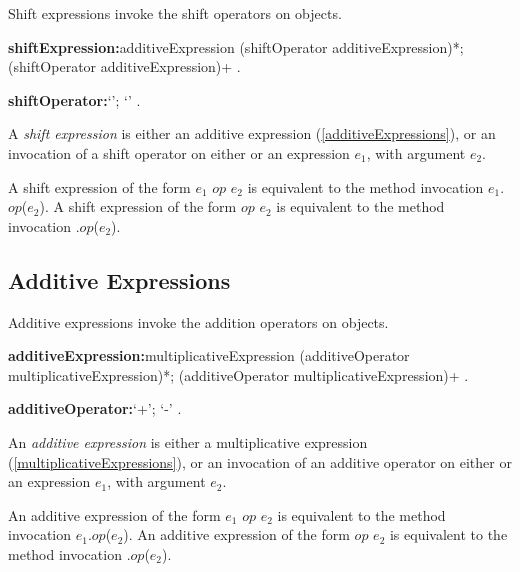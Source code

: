 \documentclass{article}
\newcommand{\code}[1]{{\sf #1}}
\begin{document}
\LMHash{}
Shift expressions invoke the shift operators on objects.

 \begin{grammar}
{\bf shiftExpression:}additiveExpression (shiftOperator additiveExpression)*;
      \SUPER{} (shiftOperator additiveExpression)+
    .

{\bf shiftOperator:}`{\escapegrammar \lt\lt'};
       `{\escapegrammar \gt \gt}' 
    .
 \end{grammar}
 
\LMHash{}
A {\em shift expression} is either an additive expression (\ref{additiveExpressions}), or an invocation of a shift operator on either \SUPER{} or an expression $e_1$, with argument $e_2$.
 
\LMHash{}
 A shift expression of the form  $e_1$ $op$ $e_2$ is equivalent to the method invocation \code{$e_1$.$op$($e_2$)}. A shift expression of the form  \SUPER{} $op$ $e_2$ is equivalent to the method invocation \code{\SUPER{}.$op$($e_2$)}. 

     
 \subsection{ Additive Expressions}

\LMHash{}
Additive expressions invoke the addition operators on objects.

 \begin{grammar}
{\bf additiveExpression:}multiplicativeExpression (additiveOperator multiplicativeExpression)*;
      \SUPER{} (additiveOperator multiplicativeExpression)+
    .

{\bf additiveOperator:}`+';
      `-'
    .
 \end{grammar}
 
\LMHash{}
An {\em additive expression} is either a multiplicative expression (\ref{multiplicativeExpressions}), or an invocation of an additive operator on either \SUPER{} or an expression $e_1$, with argument $e_2$.

\LMHash{}
An additive expression of the form  $e_1$ $op$ $e_2$ is equivalent to the method invocation \code{$e_1$.$op$($e_2$)}. An additive expression of the form  \SUPER{} $op$ $e_2$ is equivalent to the method invocation \code{\SUPER{}.$op$($e_2$)}. 
\end{document}
